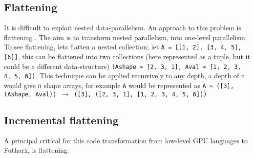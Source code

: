 \subsection{Flattening}
It is difficult to exploit nested data-parallelism. An approach to this problem is flattening \cite{flat}. The aim is to transform nested parallelism, into one-level parallelism. To see flattening, lets flatten a nested collection; let \texttt{A = [[1, 2], [3, 4, 5], [6]]}, this can be flattened into two collections (here represented as a tuple, but it could be a different data-structure) \texttt{(Ashape = [2, 3, 1], Aval = [1, 2, 3, 4, 5, 6])}. This technique can be applied recursively to any depth, a depth of \texttt{n} would give \texttt{n} shape arrays, for example \texttt{A} would be represented as \texttt{A = ([3], (Ashape, Aval)) $\to$ ([3], ([2, 3, 1], [1, 2, 3, 4, 5, 6]))}

\subsection{Incremental flattening}
A principal critical for this code transformation from low-level GPU languages to Futhark, is flattening. 


